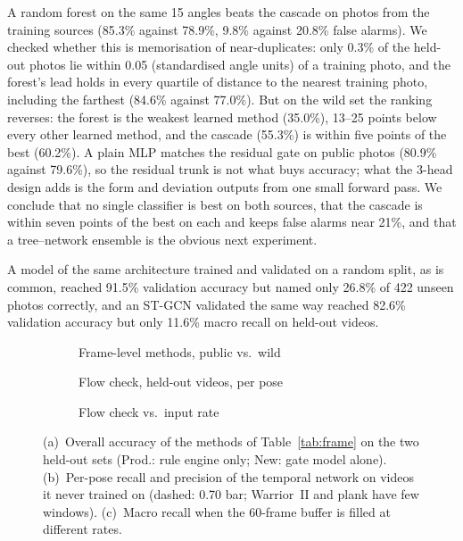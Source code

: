  A random forest on the same 15 angles beats the cascade on photos from the training sources (85.3\% against 78.9\%, 9.8\% against 20.8\% false alarms). We checked whether this is memorisation of near-duplicates: only 0.3\% of the held-out photos lie within 0.05 (standardised angle units) of a training photo, and the forest's lead holds in every quartile of distance to the nearest training photo, including the farthest (84.6\% against 77.0\%). But on the wild set the ranking reverses: the forest is the weakest learned method (35.0\%), 13--25 points below every other learned method, and the cascade (55.3\%) is within five points of the best (60.2\%). A plain MLP matches the residual gate on public photos (80.9\% against 79.6\%), so the residual trunk is not what buys accuracy; what the 3-head design adds is the form and deviation outputs from one small forward pass. We conclude that no single classifier is best on both sources, that the cascade is within seven points of the best on each and keeps false alarms near 21\%, and that a tree--network ensemble is the obvious next experiment.

 A model of the same architecture trained and validated on a random split, as is common, reached 91.5\% validation accuracy but named only 26.8\% of 422 unseen photos correctly, and an ST-GCN validated the same way reached 82.6\% validation accuracy but only 11.6\% macro recall on held-out videos.

\begin{figure}[t]
\centering
\begin{subfigure}[t]{0.32\textwidth}\centering\caption{Frame-level methods, public vs.\ wild}\end{subfigure}\hfill
\begin{subfigure}[t]{0.32\textwidth}\centering\caption{Flow check, held-out videos, per pose}\end{subfigure}\hfill
\begin{subfigure}[t]{0.32\textwidth}\centering\caption{Flow check vs.\ input rate}\end{subfigure}
\caption{(a)~Overall accuracy of the methods of Table~\ref{tab:frame} on the two held-out sets (Prod.: rule engine only; New: gate model alone). (b)~Per-pose recall and precision of the temporal network on videos it never trained on (dashed: 0.70 bar; Warrior~II and plank have few windows). (c)~Macro recall when the 60-frame buffer is filled at different rates.}
\label{fig:charts}
\end{figure}


